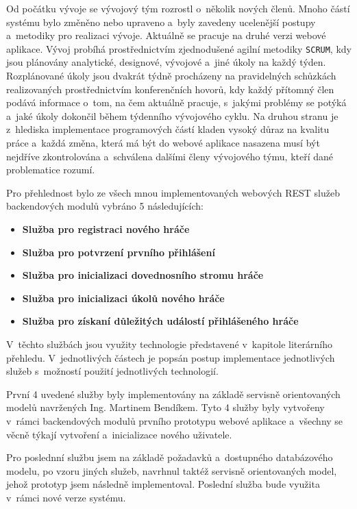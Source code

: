 \documentclass[twoside, 12pt]{article}
\begin{document}
{%
Od počátku vývoje se vývojový tým rozrostl o~několik nových členů.
Mnoho částí systému bylo změněno nebo upraveno a~byly zavedeny ucelenější postupy
a~metodiky pro realizaci vývoje.
Aktuálně se pracuje na druhé verzi webové aplikace.
Vývoj probíhá prostřednictvím
zjednodušené agilní metodiky \texttt{SCRUM}, kdy jsou plánovány analytické, designové, vývojové a~jiné
úkoly na každý týden. Rozplánované úkoly jsou dvakrát týdně procházeny na pravidelných schůzkách
realizovaných prostřednictvím konferenčních hovorů, kdy každý přítomný člen podává informace
o~tom, na čem aktuálně pracuje, s~jakými problémy se potýká a~jaké úkoly dokončil během týdenního vývojového cyklu.
Na druhou stranu je z~hlediska implementace programových částí kladen vysoký důraz na kvalitu práce
a~každá změna, která má být do webové aplikace nasazena musí být nejdříve zkontrolována a~schválena dalšími
členy vývojového týmu, kteří dané problematice rozumí.

Pro přehlednost bylo ze všech mnou implementovaných webových
REST služeb backendových modulů vybráno 5 následujících:

\begin{itemize}
\item \textbf{Služba pro registraci nového hráče}
\item \textbf{Služba pro potvrzení prvního přihlášení}
\item \textbf{Služba pro inicializaci dovednosního stromu hráče}
\item \textbf{Služba pro inicializaci úkolů nového hráče}
\item \textbf{Služba pro získaní důležitých událostí přihlášeného hráče}
\end{itemize}

V~těchto službách jsou využity technologie představené v~kapitole literárního přehledu.
V~jednotlivých částech je popsán postup implementace jednotlivých služeb s~možností použití jednotlivých technologií.

První 4 uvedené služby byly implementovány na základě servisně orientovaných modelů navržených Ing. Martinem Bendíkem.
Tyto 4 služby byly vytvořeny v~rámci backendových modulů prvního prototypu webové aplikace
a~všechny se věcně týkají vytvoření a~inicializace nového uživatele.

Pro poslednní službu jsem na základě požadavků a~dostupného databázového modelu,
po vzoru jiných služeb, navrhnul taktéž servisně orientovaných model,
jehož prototyp jsem následně implementoval.
Poslední služba bude využita v~rámci nové verze systému.

}
\end{document}
